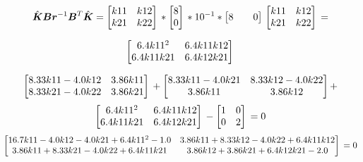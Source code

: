 \documentclass[a4paper]{article}
\begin{document}
\[
\hat{\boldsymbol{K}}\boldsymbol{B}\boldsymbol{r}^{-1}\boldsymbol{B}^T\hat{\boldsymbol{K}} =
\begin{bmatrix}
    k11 & k12 \\
    k21 & k22 \\
\end{bmatrix}\\ *
\begin{bmatrix}
    8 \\
    0 \\
\end{bmatrix}\\ *
10^{-1} *
\begin{bmatrix}
    8 &&
    0 
\end{bmatrix}\\
\begin{bmatrix}
    k11 & k12 \\
    k21 & k22 \\
\end{bmatrix}\\ = 
\]

\[
\begin{bmatrix}
    6.4k11^2 & 6.4k11k12 \\
    6.4k11k21 & 6.4k12k21 \\
\end{bmatrix}\\
\]


\[
\begin{bmatrix}
    8.33k11 - 4.0k12 & 3.86k11 \\
    8.33k21 - 4.0k22 & 3.86k21 \\
\end{bmatrix}\\+
\begin{bmatrix}
    8.33k11 - 4.0k21 & 8.33k12 - 4.0k22 \\
    3.86k11 & 3.86k12 \\
\end{bmatrix}\\+
\]
\[
\begin{bmatrix}
    6.4k11^2 & 6.4k11k12 \\
    6.4k11k21 & 6.4k12k21 \\
\end{bmatrix}\\-
\begin{bmatrix}
    1 & 0 \\
    0 & 2 \\
\end{bmatrix}\\ = 0
\]
\[
\begin{bmatrix}
    16.7k11 - 4.0k12 - 4.0k21 + 6.4k11^2 - 1.0 & 3.86k11 + 8.33k12 - 4.0k22 + 6.4k11k12\\
    3.86k11 + 8.33k21 - 4.0k22 + 6.4k11k21 & 3.86k12 + 3.86k21 + 6.4k12k21 - 2.0 \\
\end{bmatrix}\\ = 0
\]
\end{document}
